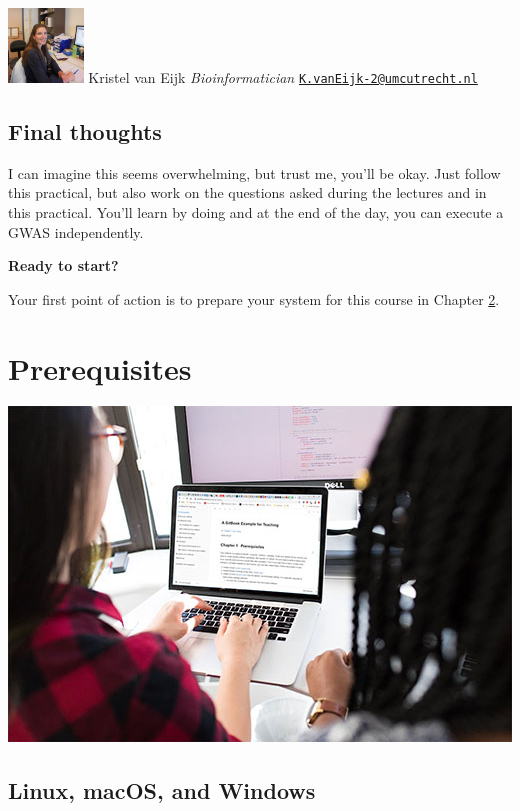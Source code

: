 \documentclass[
]{book}
\begin{document}
\includegraphics[width=0.15\textwidth,height=\textheight]{img/kristel_van_eijk.jpg}
Kristel van Eijk
\emph{Bioinformatician}
\href{mailto:K.vanEijk-2@umcutrecht.nl}{\nolinkurl{K.vanEijk-2@umcutrecht.nl}}

\hypertarget{final-thoughts}{%
\section{Final thoughts}\label{final-thoughts}}

I can imagine this seems overwhelming, but trust me, you'll be okay. Just follow this practical, but also work on the questions asked during the lectures and in this practical. You'll learn by doing and at the end of the day, you can execute a GWAS independently.

\textbf{Ready to start?}

Your first point of action is to prepare your system for this course in Chapter \ref{prerequisites}.

\hypertarget{prerequisites}{%
\chapter{Prerequisites}\label{prerequisites}}

\includegraphics{img/girls_behind_macbook.jpeg}

\hypertarget{linux-macos-and-windows}{%
\section{Linux, macOS, and Windows}\label{linux-macos-and-windows}}
\end{document}
